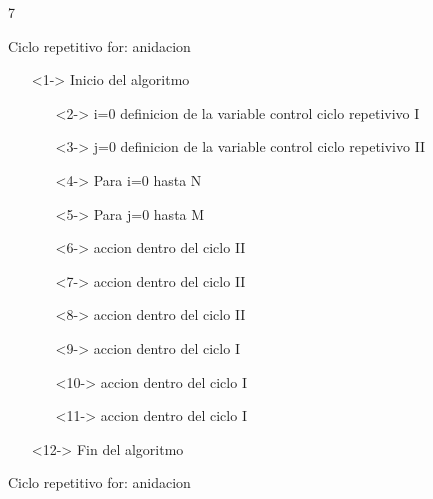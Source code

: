 7\documentclass[xcolor=pdftex,table,11pt]{beamer}
\begin{document}
\begin{frame}{Ciclo repetitivo for: anidacion}
\begin{itemize}
   \item[]<1-> Inicio del algoritmo

   \begin{itemize}
   		\item[]<2-> i=0 definicion de la variable control ciclo repetivivo I
   		\item[]<3-> j=0 definicion de la variable control ciclo repetivivo II
     	\item[]<4-> Para i=0 hasta N
     		\item[]<5-> \hspace{0.3in} Para j=0 hasta M
     		\item[]<6->  \hspace{0.5in} accion dentro del ciclo II
         	\item[]<7->  \hspace{0.5in} accion dentro del ciclo II
			\item[]<8->  \hspace{0.5in} accion dentro del ciclo II
   
   \item[]<9->  \hspace{0.3in}  accion dentro del ciclo I
   \item[]<10->  \hspace{0.3in}  accion dentro del ciclo I
   \item[]<11->  \hspace{0.3in}  accion dentro del ciclo I
   \end{itemize}
  \item[]<12-> Fin del algoritmo\end{itemize}
\end{frame}


\begin{frame}{Ciclo repetitivo for: anidacion}
\codesetstylefrombeamer
{}
\end{frame}
\end{document}
